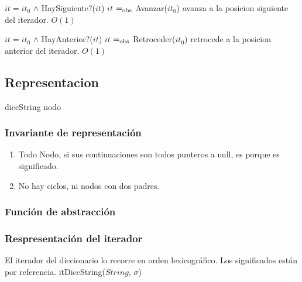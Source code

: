   {$it = it_0$ $\land$ HaySiguiente?($it$)}
  {$it$ $=_{\mathrm{obs}}$ Avanzar($it_0$)}
  {avanza a la posicion siguiente del iterador.}
  {$O(1)$}
  {}

  {$it = it_0$ $\land$ HayAnterior?($it$)}
  {$it$ $=_{\mathrm{obs}}$ Retroceder($it_0$)}
  {retrocede a la posicion anterior del iterador.}
  {$O(1)$}
  {}



\subsection{Representacion}
diccString
nodo


\subsubsection*{Invariante de representación}


\begin{enumerate}
\item Todo Nodo, si sus continuaciones son todos punteros a null, es porque es significado.
\item No hay ciclos, ni nodos con dos padres.
\end{enumerate}

\subsubsection*{Función de abstracción}

\subsubsection*{Respresentación del iterador}

  El iterador del diccionario lo recorre en orden lexicográfico. Los significados están por referencia.
itDiccString($String$, $\sigma$)


  

  ~

